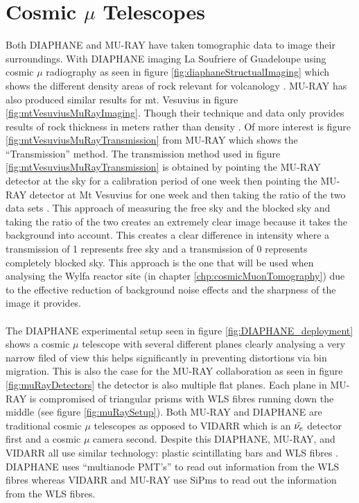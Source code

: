 \section{Cosmic $\mu$ Telescopes} \label{sec:cosmicMuTelescopes}
Both DIAPHANE and MU-RAY have taken tomographic data to image their surroundings. With DIAPHANE imaging La Soufriere of Guadeloupe using cosmic $\mu$ radiography as seen in figure \ref{fig:diaphaneStructualImaging} which shows the different density areas of rock relevant for volcanology \cite{Marteau_2017}.  MU-RAY has also produced similar results for mt. Vesuvius in figure \ref{fig:mtVesuviusMuRayImaging}. Though their technique and data only provides results of rock thickness in meters rather than density \cite{Ambrosino_2014}. Of more interest is figure \ref{fig:mtVesuviusMuRayTransmission} from MU-RAY which shows the ``Transmission'' method. The transmission method used in figure \ref{fig:mtVesuviusMuRayTransmission} is obtained by pointing the MU-RAY detector at the sky for a calibration period of one week then pointing the MU-RAY detector at Mt Vesuvius for one week and then taking the ratio of the two data sets \cite{Ambrosino_2014}. This approach of measuring the free sky and the blocked sky and taking the ratio of the two creates an extremely clear image because it takes the background into account. This creates a clear difference in intensity where a transmission of 1 represents free sky and a transmission of 0 represents completely blocked sky. This approach is the one that will be used when analysing the Wylfa reactor site (in chapter \ref{chp:cosmicMuonTomography}) due to the effective reduction of background noise effects and the sharpness of the image it provides. 
\\\\The DIAPHANE experimental setup seen in figure \ref{fig:DIAPHANE_deployment} shows a cosmic $\mu$ telescope with several different planes clearly analysing a very narrow filed of view this helps significantly in preventing distortions via bin migration. This is also the case for the MU-RAY collaboration as seen in figure \ref{fig:muRayDetectors} the detector is also multiple flat planes. Each plane in MU-RAY is compromised of triangular prisms with WLS fibres running down the middle (see figure \ref{fig:muRaySetup}). Both MU-RAY and DIAPHANE are traditional cosmic $\mu$ telescopes as opposed to VIDARR which is an $\Bar{\nu_e}$ detector first and a cosmic $\mu$ camera second. Despite this DIAPHANE, MU-RAY, and VIDARR all use similar technology: plastic scintillating bars and WLS fibres \cite{Carroll_2018} \cite{Marteau_2017} \cite{ANASTASIO2013423}. DIAPHANE uses ``multianode PMT’s'' to read out information from the WLS fibres \cite{Marteau_2017} whereas VIDARR and MU-RAY use SiPms \cite{Carroll_2018} \cite{ANASTASIO2013423} to read out the information from the WLS fibres. 


